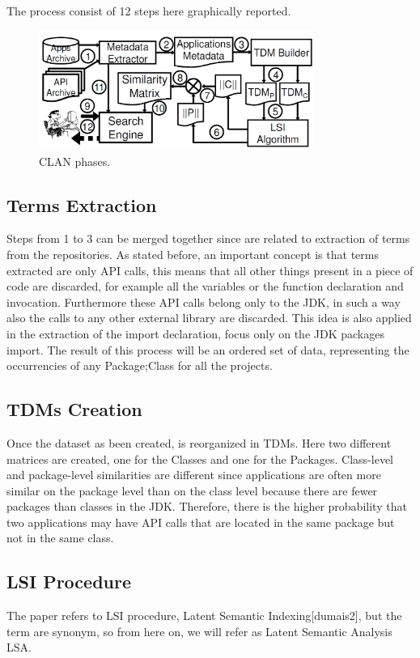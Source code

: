 The process consist of 12 steps here graphically reported.

\begin{figure}[!h]
\includegraphics[width=0.80\textwidth]{images/Clan.png}
\centering
\caption{CLAN phases.}
\end{figure}



\subsection{Terms Extraction}
Steps from 1 to 3 can be merged together since are related to extraction of terms from the repositories.
As stated before, an important concept is that terms extracted are only API calls, this means that all other things present in a piece of code are discarded, for example all the variables or the function declaration and invocation. Furthermore these API calls belong only to the JDK, in such a way also the calls to any other external library are discarded. This idea is also applied in the extraction of the import declaration, focus only on the JDK packages import.
The result of this process will be an ordered set of data, representing the occurrencies of any Package;Class for all the projects.

\subsection{TDMs Creation}
Once the dataset as been created, is reorganized in TDMs. Here two different matrices are created, one for the Classes and one for the Packages. Class-level and package-level similarities are different since applications are often more similar on the package level than on the class level because there are fewer packages than classes in the JDK. Therefore, there is the higher probability that two applications may have API calls that are located in the same package but not in the same class.

\subsection{LSI Procedure}
The paper refers to LSI procedure, Latent Semantic Indexing[dumais2], but the term are synonym, so from here on, we will refer as Latent Semantic Analysis LSA.

